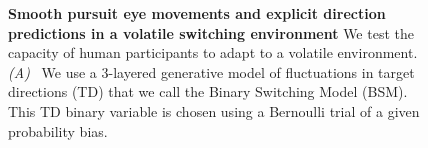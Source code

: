 \documentclass[10pt,letterpaper]{article}
\begin{document}
\begin{figure}%
\caption{
\textbf{Smooth pursuit eye movements and explicit direction predictions in a volatile switching environment}
We test the capacity of human participants to adapt to a volatile environment.
\textit{(A)}~
We use a 3-layered generative model of fluctuations in target directions (TD)
that we call the Binary Switching Model (BSM).
This TD binary variable is chosen using a Bernoulli trial of a given probability bias.
}
\end{figure}
\end{document}
